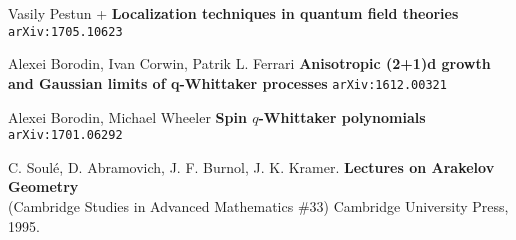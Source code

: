 \documentclass[12pt]{article}
\begin{document}
\vfill

\begin{thebibliography}{}

\item Vasily Pestun + \textbf{Localization techniques in quantum field theories} \texttt{arXiv:1705.10623}

\item Alexei Borodin, Ivan Corwin, Patrik L. Ferrari \textbf{Anisotropic (2+1)d growth and Gaussian limits of q-Whittaker processes} 
\texttt{arXiv:1612.00321}

\item Alexei Borodin, Michael Wheeler \textbf{Spin $q$-Whittaker polynomials} \texttt{arXiv:1701.06292}

\item  C. Soul\'{e}, D. Abramovich, J. F. Burnol, J. K. Kramer. \textbf{Lectures on Arakelov Geometry } \\ (Cambridge Studies in Advanced Mathematics \#33)  Cambridge University Press, 1995.

\end{thebibliography}
\end{document}
